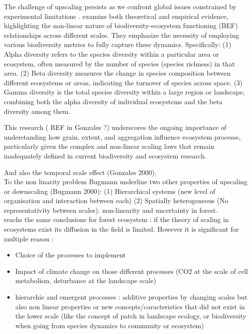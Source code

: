 \documentclass{article}
\begin{document}
The challenge of upscaling persists as we confront global issues constrained by experimental limitations \cite[see Fig. \ref{fig:BEF_scales}]{gonzalezScalingupBiodiversityecosystemFunctioning2020}. \textcite{gonzalezScalingupBiodiversityecosystemFunctioning2020} examine both theoretical and empirical evidence, highlighting the non-linear nature of biodiversity-ecosystem functioning (BEF) relationships across different scales. They emphasize the necessity of employing various biodiversity metrics to fully capture these dynamics. Specifically: (1) Alpha diversity refers to the species diversity within a particular area or ecosystem, often measured by the number of species (species richness) in that area. (2) Beta diversity measures the change in species composition between different ecosystems or areas, indicating the turnover of species across space. (3) Gamma diversity is the total species diversity within a large region or landscape, combining both the alpha diversity of individual ecosystems and the beta diversity among them.

This research (\cite{gonzalezScalingupBiodiversityecosystemFunctioning2020} REF in Gonzales ?) underscores the ongoing importance of understanding how grain, extent, and aggregation influence ecosystem processe, particularly given the complex and non-linear scaling laws that remain inadequately defined in current biodiversity and ecosystem research.

And also the temporal scale effect (Gonzales 2000). \\

To the non linarity problem Bugmann underline two other properties of upscaling or downscaling (Bugmann 2000): (1) Hierarchical systems (new level of organisation and interaction between each) (2) Spatially heterogeneous (No representativity between scales). 
\cite{messierDealingNonlinearityUncertainty2016} non-linearity and uncertainty in forest. \\

\textcite{seidlScalingIssuesForest2013} reachs the same conclusions for forest ecosystem : if the theory of scaling in ecosystems exist its diffusion in the field is limited. However it is significant for multiple reason :
\begin{itemize}
    \item Choice of the processes to implement
    \item Impact of climate change on those different processes (CO2 at the scale of cell metabolism, dsturbance at the landscape scale)
    \item hierarchie and emergent processes : additive properties by changing scales but also non linear properties or new concepts/caracteristics that did not exist in the lower scale (like the concept of patch in landscape ecology, or biodiversity when going from species dynamics to community or ecosystem)
\end{itemize}
\end{document}
